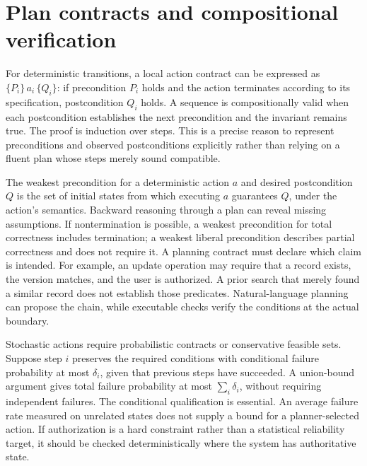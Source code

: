 \section{Plan contracts and compositional verification}
\label{sec:C10:contracts}
For deterministic transitions, a local action contract can be expressed as $\{P_i\}\,a_i\,\{Q_i\}$: if precondition $P_i$ holds and the action terminates according to its specification, postcondition $Q_i$ holds. A sequence is compositionally valid when each postcondition establishes the next precondition and the invariant remains true. The proof is induction over steps. This is a precise reason to represent preconditions and observed postconditions explicitly rather than relying on a fluent plan whose steps merely sound compatible.

The weakest precondition for a deterministic action $a$ and desired postcondition $Q$ is the set of initial states from which executing $a$ guarantees $Q$, under the action's semantics. Backward reasoning through a plan can reveal missing assumptions. If nontermination is possible, a weakest precondition for total correctness includes termination; a weakest liberal precondition describes partial correctness and does not require it. A planning contract must declare which claim is intended. For example, an update operation may require that a record exists, the version matches, and the user is authorized. A prior search that merely found a similar record does not establish those predicates. Natural-language planning can propose the chain, while executable checks verify the conditions at the actual boundary.

Stochastic actions require probabilistic contracts or conservative feasible sets. Suppose step $i$ preserves the required conditions with conditional failure probability at most $\delta_i$, given that previous steps have succeeded. A union-bound argument gives total failure probability at most $\sum_i\delta_i$, without requiring independent failures. The conditional qualification is essential. An average failure rate measured on unrelated states does not supply a bound for a planner-selected action. If authorization is a hard constraint rather than a statistical reliability target, it should be checked deterministically where the system has authoritative state.

